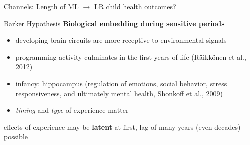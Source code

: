 \documentclass[aspectratio=169,handout]{beamer} %
\begin{document}
\begin{frame}{Channels: Length of ML $\rightarrow$ LR child health outcomes?}
	\begin{block}{Barker Hypothesis}\pause
			\textbf{Biological embedding during sensitive periods}
			\begin{itemize}
				\item developing brain circuits are more receptive to environmental signals
				\item programming activity culminates in the first years of life (Räikkönen et al., 2012)
				\item infancy: hippocampus (regulation of emotions, social behavior, stress responsiveness, and ultimately mental health, Shonkoff et al., 2009)
				\item \emph{timing} and \emph{type} of experience matter\pause
			\end{itemize}
		effects of experience may be \textbf{latent} at first, lag of many years (even decades) possible
	\end{block}	
\end{frame}
\end{document}
